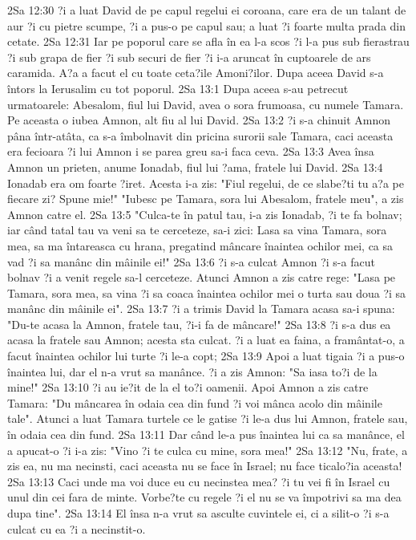 2Sa 12:30  ?i a luat David de pe capul regelui ei coroana, care era de un talant de aur ?i cu pietre scumpe, ?i a pus-o pe capul sau; a luat ?i foarte multa prada din cetate.
2Sa 12:31  Iar pe poporul care se afla în ea l-a scos ?i l-a pus sub fierastrau ?i sub grapa de fier ?i sub securi de fier ?i i-a aruncat în cuptoarele de ars caramida. A?a a facut el cu toate ceta?ile Amoni?ilor. Dupa aceea David s-a întors la Ierusalim cu tot poporul.
2Sa 13:1  Dupa aceea s-au petrecut urmatoarele: Abesalom, fiul lui David, avea o sora frumoasa, cu numele Tamara. Pe aceasta o iubea Amnon, alt fiu al lui David.
2Sa 13:2  ?i s-a chinuit Amnon pâna într-atâta, ca s-a îmbolnavit din pricina surorii sale Tamara, caci aceasta era fecioara ?i lui Amnon i se parea greu sa-i faca ceva.
2Sa 13:3  Avea însa Amnon un prieten, anume Ionadab, fiul lui ?ama, fratele lui David.
2Sa 13:4  Ionadab era om foarte ?iret. Acesta i-a zis: "Fiul regelui, de ce slabe?ti tu a?a pe fiecare zi? Spune mie!" "Iubesc pe Tamara, sora lui Abesalom, fratele meu", a zis Amnon catre el.
2Sa 13:5  "Culca-te în patul tau, i-a zis Ionadab, ?i te fa bolnav; iar când tatal tau va veni sa te cerceteze, sa-i zici: Lasa sa vina Tamara, sora mea, sa ma întareasca cu hrana, pregatind mâncare înaintea ochilor mei, ca sa vad ?i sa manânc din mâinile ei!"
2Sa 13:6  ?i s-a culcat Amnon ?i s-a facut bolnav ?i a venit regele sa-l cerceteze. Atunci Amnon a zis catre rege: "Lasa pe Tamara, sora mea, sa vina ?i sa coaca înaintea ochilor mei o turta sau doua ?i sa manânc din mâinile ei".
2Sa 13:7  ?i a trimis David la Tamara acasa sa-i spuna: "Du-te acasa la Amnon, fratele tau, ?i-i fa de mâncare!"
2Sa 13:8  ?i s-a dus ea acasa la fratele sau Amnon; acesta sta culcat. ?i a luat ea faina, a framântat-o, a facut înaintea ochilor lui turte ?i le-a copt;
2Sa 13:9  Apoi a luat tigaia ?i a pus-o înaintea lui, dar el n-a vrut sa manânce. ?i a zis Amnon: "Sa iasa to?i de la mine!"
2Sa 13:10  ?i au ie?it de la el to?i oamenii. Apoi Amnon a zis catre Tamara: "Du mâncarea în odaia cea din fund ?i voi mânca acolo din mâinile tale". Atunci a luat Tamara turtele ce le gatise ?i le-a dus lui Amnon, fratele sau, în odaia cea din fund.
2Sa 13:11  Dar când le-a pus înaintea lui ca sa manânce, el a apucat-o ?i i-a zis: "Vino ?i te culca cu mine, sora mea!"
2Sa 13:12  "Nu, frate, a zis ea, nu ma necinsti, caci aceasta nu se face în Israel; nu face ticalo?ia aceasta!
2Sa 13:13  Caci unde ma voi duce eu cu necinstea mea? ?i tu vei fi în Israel cu unul din cei fara de minte. Vorbe?te cu regele ?i el nu se va împotrivi sa ma dea dupa tine".
2Sa 13:14  El însa n-a vrut sa asculte cuvintele ei, ci a silit-o ?i s-a culcat cu ea ?i a necinstit-o.
